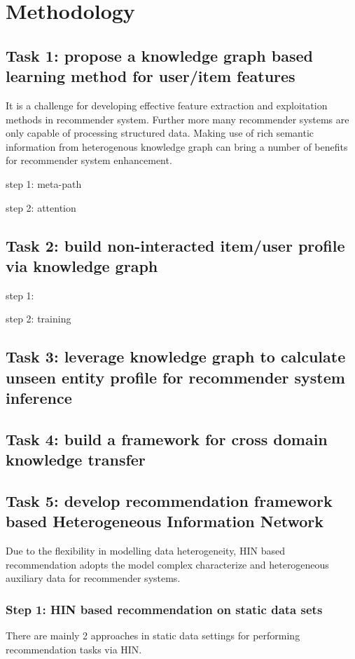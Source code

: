 \section{Methodology}

\subsection{Task 1: propose a knowledge graph based learning method for user/item features}
It is a challenge for developing effective feature extraction and exploitation methods in recommender system. Further more many recommender systems are only capable of processing structured data. Making use of rich semantic information from heterogenous knowledge graph can bring a number of benefits for recommender system enhancement.

step 1: meta-path

step 2: attention


\subsection{Task 2: build non-interacted item/user profile via knowledge graph}

step 1: 

step 2: training

\subsection{Task 3: leverage knowledge graph to calculate unseen entity profile for recommender system inference}

\subsection{Task 4: build a framework for cross domain knowledge transfer}

\subsection{Task 5: develop recommendation framework based Heterogeneous Information Network}

Due to the flexibility in modelling data heterogeneity, HIN based recommendation adopts the model complex characterize and heterogeneous auxiliary data for recommender systems.

\subsubsection*{Step 1: HIN based recommendation on static data sets}
There are mainly 2 approaches in static data settings for performing recommendation tasks via HIN. 


